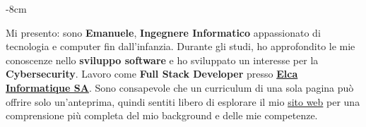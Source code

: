 \documentclass[10pt,a4paper]{altacv}
\begin{document}







\begin{adjustwidth}{}{-8cm}
\makecvheader
\end{adjustwidth}

Mi presento: sono \textbf{Emanuele}, \textbf{Ingegnere Informatico} appassionato di tecnologia e computer fin dall'infanzia. Durante gli studi, ho approfondito le mie conoscenze nello \textbf{sviluppo software} e ho sviluppato un interesse per la \textbf{Cybersecurity}. Lavoro come \textbf{Full Stack Developer} presso \href{https://www.elca.ch/}{\textbf{Elca Informatique SA}}. Sono consapevole che un curriculum di una sola pagina può offrire solo un'anteprima, quindi sentiti libero di esplorare il mio \href{https://emanueleseminara.it/}{sito web} per una comprensione più completa del mio background e delle mie competenze.


\end{document}
